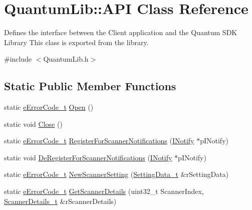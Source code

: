 \hypertarget{class_quantum_lib_1_1_a_p_i}{}\section{Quantum\+Lib\+:\+:A\+PI Class Reference}
\label{class_quantum_lib_1_1_a_p_i}


Defines the interface between the Client application and the Quantum S\+DK Library This class is exported from the library.  




{\ttfamily \#include $<$Quantum\+Lib.\+h$>$}

\subsection*{Static Public Member Functions}
\begin{DoxyCompactItemize}
\item 
static \mbox{\hyperlink{namespace_quantum_lib_ae3625bf7f9a1ca0d93adb9a2e0194d47}{e\+Error\+Code\+\_\+t}} \mbox{\hyperlink{class_quantum_lib_1_1_a_p_i_a6be3553bb420e8f804d1ea652273cc99}{Open}} ()
\item 
static void \mbox{\hyperlink{class_quantum_lib_1_1_a_p_i_a6bbad3a3b12aa11c0347edf6cd467622}{Close}} ()
\item 
static \mbox{\hyperlink{namespace_quantum_lib_ae3625bf7f9a1ca0d93adb9a2e0194d47}{e\+Error\+Code\+\_\+t}} \mbox{\hyperlink{class_quantum_lib_1_1_a_p_i_ad63c6415fc479338caecd97f05c06b02}{Register\+For\+Scanner\+Notifications}} (\mbox{\hyperlink{class_quantum_lib_1_1_i_notify}{I\+Notify}} $\ast$p\+I\+Notify)
\item 
static void \mbox{\hyperlink{class_quantum_lib_1_1_a_p_i_ac0ea416a147cf8187e7595cedaf2fdf0}{De\+Register\+For\+Scanner\+Notifications}} (\mbox{\hyperlink{class_quantum_lib_1_1_i_notify}{I\+Notify}} $\ast$p\+I\+Notify)
\item 
static \mbox{\hyperlink{namespace_quantum_lib_ae3625bf7f9a1ca0d93adb9a2e0194d47}{e\+Error\+Code\+\_\+t}} \mbox{\hyperlink{class_quantum_lib_1_1_a_p_i_a9102a0ac0ca44b4d4f7a677e48b3d277}{New\+Scanner\+Setting}} (\mbox{\hyperlink{struct_quantum_lib_1_1_setting_data__t}{Setting\+Data\+\_\+t}} \&r\+Setting\+Data)
\item 
static \mbox{\hyperlink{namespace_quantum_lib_ae3625bf7f9a1ca0d93adb9a2e0194d47}{e\+Error\+Code\+\_\+t}} \mbox{\hyperlink{class_quantum_lib_1_1_a_p_i_a69765cc3f7ccd4e1a6c8a3f3f0b0aeeb}{Get\+Scanner\+Details}} (uint32\+\_\+t Scanner\+Index, \mbox{\hyperlink{struct_quantum_lib_1_1_scanner_details__t}{Scanner\+Details\+\_\+t}} \&r\+Scanner\+Details)
\end{DoxyCompactItemize}


